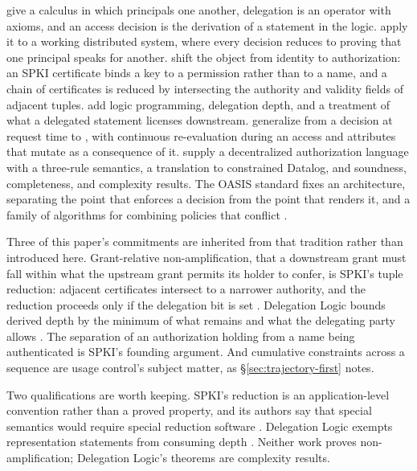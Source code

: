 \Textcite{abadi1993calculus} give a calculus in which principals  one another, delegation is an operator with axioms, and an access decision is the derivation of a statement in the logic. \Textcite{lampson1992authentication} apply it to a working distributed system, where every decision reduces to proving that one principal speaks for another. \Textcite{ellison1999spki} shift the object from identity to authorization: an SPKI certificate binds a key to a permission rather than to a name, and a chain of certificates is reduced by intersecting the authority and validity fields of adjacent tuples. \Textcite{li2003delegation} add logic programming, delegation depth, and a treatment of what a delegated statement licenses downstream. \Textcite{park2004ucon} generalize from a decision at request time to , with continuous re-evaluation during an access and attributes that mutate as a consequence of it. \Textcite{becker2010secpal} supply a decentralized authorization language with a three-rule semantics, a translation to constrained Datalog, and soundness, completeness, and complexity results. The OASIS  standard fixes an architecture, separating the point that enforces a decision from the point that renders it, and a family of algorithms for combining policies that conflict \citep{oasis2013xacml}.

Three of this paper's commitments are inherited from that tradition rather than introduced here. Grant-relative non-amplification, that a downstream grant must fall within what the upstream grant permits its holder to confer, is SPKI's tuple reduction: adjacent certificates intersect to a narrower authority, and the reduction proceeds only if the delegation bit is set \citep[sec.~6.3]{ellison1999spki}. Delegation Logic bounds derived depth by the minimum of what remains and what the delegating party allows \citep[sec.~5]{li2003delegation}. The separation of an authorization holding from a name being authenticated is SPKI's founding argument. And cumulative constraints across a sequence are usage control's subject matter, as \S\ref{sec:trajectory-first} notes.

Two qualifications are worth keeping. SPKI's reduction is an application-level convention rather than a proved property, and its authors say that special semantics would require special reduction software \citep[sec.~6.3.1]{ellison1999spki}. Delegation Logic exempts representation statements from consuming depth \citep[sec.~4]{li2003delegation}. Neither work proves non-amplification; Delegation Logic's theorems are complexity results.

